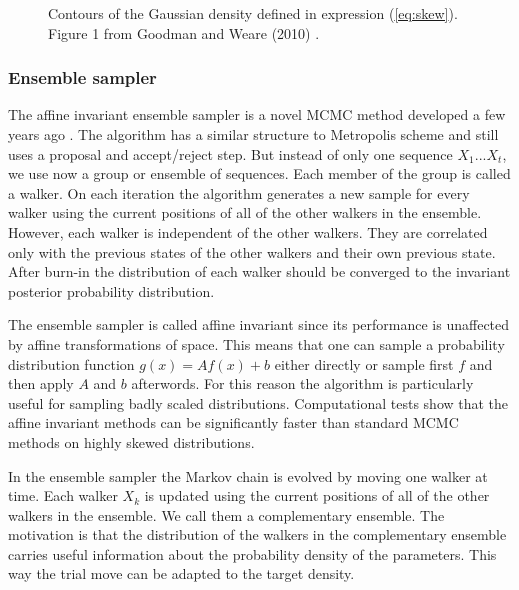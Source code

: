 \documentclass{wihuri}
\begin{document}
\begin{figure}
\centerline{}
\caption{Contours of the Gaussian density defined in expression (\ref{eq:skew}). Figure 1 from Goodman and Weare (2010) \cite{ensemble1}.
\label{fig:skewed}}
\end{figure}


\subsubsection{Ensemble sampler}

The affine invariant ensemble sampler is a novel MCMC method developed a few years ago \cite{ensemble1}. %
The algorithm has a similar structure to Metropolis scheme and still uses a proposal and accept/reject step. But instead of only one sequence $X_{1}...X_{t}$, we use now a group or ensemble of sequences. Each member of the group is called a walker. On each iteration the algorithm generates a new sample for every walker using the  current positions of all of the other walkers in
the ensemble. However, each walker is independent of the other walkers. They are correlated only with the previous states of the other walkers and their own previous state. After burn-in the distribution of each walker should be converged to the invariant posterior probability distribution.






The ensemble sampler is called affine invariant since its performance is unaffected by affine transformations of space. This means that one can sample a probability distribution function $g(x) = Af(x) + b$ either directly or sample first $f$ and then apply $A$ and $b$ afterwords. 
For this reason the algorithm is particularly useful for sampling badly scaled distributions. Computational tests show that the affine invariant methods can be significantly faster than standard MCMC methods on highly skewed distributions.

In the ensemble sampler the  Markov chain is evolved by moving one walker at time. Each walker $X_{k}$ is updated using the current positions of all of the other walkers in
the ensemble. We call them a complementary ensemble. The motivation is that the distribution of the walkers in the complementary ensemble carries useful information about the probability density of the parameters. This way the trial move can be adapted to the target density.  
\end{document}
